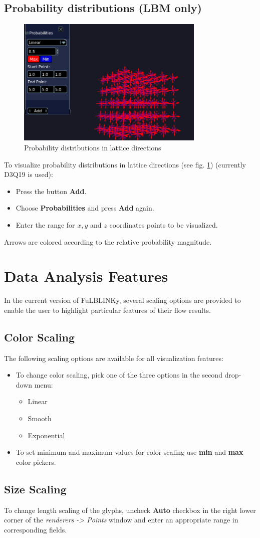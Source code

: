 \documentclass[
12pt, %
a4paper, %
oneside, %
headinclude,footinclude, %
BCOR5mm, %
]{scrartcl}
\begin{document}
\subsection{Probability distributions (LBM only)}
\begin{figure}[h]
 \includegraphics[width=0.8\textwidth]{probabilities.png}
 \caption{Probability distributions in lattice directions}
 \label{fig:probabilities}
\end{figure}
To visualize probability distributions in lattice directions (see fig. \ref{fig:probabilities}) (currently D3Q19 is used):
\begin{itemize}
\item Press the button \textbf{Add}.
\item Choose \textbf{Probabilities} and press \textbf{Add} again.
\item Enter the range for $x, y$ and $z$ coordinates points to be visualized.
\end{itemize}
Arrows are colored according to the relative probability magnitude. 




\section{Data Analysis Features}
In the current version of FuLBLINKy, several scaling options are provided to enable the user to highlight particular features of their flow results.

\subsection{Color Scaling}
The following scaling options are available for all visualization features:
\begin{itemize}
\item To change color scaling, pick one of the three options in the second drop-down menu:
\begin{itemize}
\item Linear
\item Smooth
\item Exponential
\end{itemize}
\item To set minimum and maximum values for color scaling use \textbf{min} and \textbf{max} color pickers.\\
\end{itemize}

\subsection{Size Scaling}
To change length scaling of the glyphs, uncheck \textbf{Auto} checkbox in the right lower corner of the \textit{renderers -> Points} window and enter an appropriate range in corresponding fields.
\end{document}
